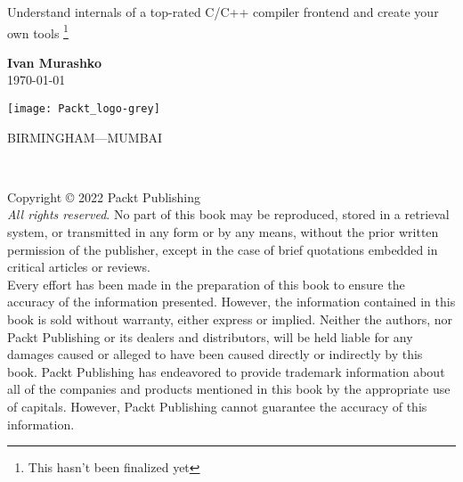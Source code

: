 \pagestyle{empty}
\nopagecolor
\begin{flushleft}

\fontsize{35}{40}

\vspace{0.3 cm}

\Large {\itshape }

\vspace{3 cm}
{\Large Understand internals of a top-rated C/C++ compiler frontend and create
  your own tools }\footnote{This hasn't been finalized yet}

\vspace{3 cm}

\large \textbf {Ivan Murashko}\\
\today\\

\vspace{4 cm}

\texttt{[image: Packt\_logo-grey]}

{\small BIRMINGHAM—MUMBAI}
\newpage

\\
\vspace{0.15 cm}
\large{\itshape }

\vspace{0.3 cm}
\normalsize{
Copyright © 2022 Packt Publishing\\
\vspace{0.3 cm}
{\itshape All rights reserved}. No part of this book may be reproduced, stored in a retrieval system,
or transmitted in any form or by any means, without the prior written permission of the
publisher, except in the case of brief quotations embedded in critical articles or reviews.\\
\vspace{0.15 cm}
Every effort has been made in the preparation of this book to ensure the accuracy of the
information presented. However, the information contained in this book is sold without
warranty, either express or implied. Neither the authors, nor Packt Publishing or its
dealers and distributors, will be held liable for any damages caused or alleged to have
been caused directly or indirectly by this book.
\vspace{0.15 cm}
Packt Publishing has endeavored to provide trademark information about all of the
companies and products mentioned in this book by the appropriate use of capitals.
However, Packt Publishing cannot guarantee the accuracy of this information.

}
\end{flushleft}
